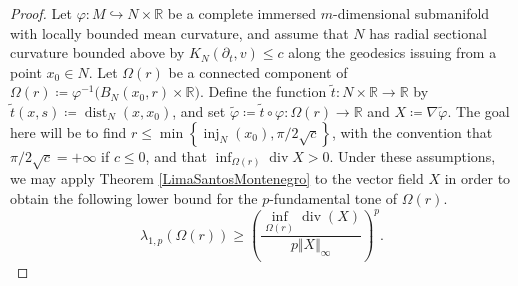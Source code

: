 \documentclass{article}
\begin{document}
\begin{proof}
Let $\varphi \colon M \hookrightarrow N \times \mathbb{R}$ be a complete immersed $m$-dimensional submanifold with locally bounded mean curvature, and assume that $N$ has radial sectional curvature bounded above by $K_N(\partial_t,v) \leq c$ along the geodesics issuing from a point $x_0 \in N$. Let $\Omega(r)$ be a connected component of $\Omega(r) \coloneqq \varphi^{-1}\bigl(B_N(x_0,r) \times \mathbb{R}\bigr)$. Define the function $\widetilde{t} \colon N \times \mathbb{R} \to \mathbb{R}$ by $\widetilde{t}(x,s) \coloneqq \operatorname{dist}_N(x,x_0)$, and set $\widetilde{\varphi} \coloneqq \widetilde{t} \circ \varphi \colon \Omega(r) \to \mathbb{R}$ and $X \coloneqq \nabla \widetilde{\varphi}$. The goal here will be to find $r \leq \min \left\{\operatorname{inj}_N(x_0), \pi/2\sqrt{c} \right\}$, with the convention that ${\pi}/{2\sqrt{c}} = +\infty$ if $c \leq 0$, and that $\inf_{\Omega(r)} \operatorname{div} X > 0$. Under these assumptions, we may apply Theorem \ref{LimaSantosMontenegro} to the vector field $X$ in order to obtain the following lower bound for the $p$-fundamental tone of $\Omega(r)$.
\begin{equation}\label{ptoneestimateee}
     \lambda_{1,p}(\Omega(r)) \geq \left( \frac{\displaystyle \inf_{\Omega(r)}{\operatorname{div}(X)}}{p  \Vert X \Vert_{\infty}} \right)^p. 
\end{equation}


\end{proof}
\end{document}

